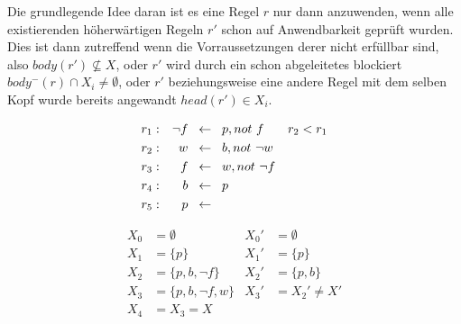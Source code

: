 Die grundlegende Idee daran ist es eine Regel $r$ nur dann anzuwenden, wenn alle
existierenden höherwärtigen Regeln $r'$ schon auf Anwendbarkeit geprüft wurden.
Dies ist dann zutreffend wenn die Vorraussetzungen derer nicht erfüllbar sind, also
$body(r') \not\subseteq X$, oder $r'$ wird durch ein schon abgeleitetes blockiert
$body^-(r) \cap X_i \neq \emptyset$, oder $r'$ beziehungsweise eine andere Regel mit
dem selben Kopf wurde bereits angewandt $head(r') \in X_i$. \\

\begin{minipage}{0.8\textwidth}
  \begin{example}
    \begin{align*}
      r_1: && \neg f \hspace*{0.2cm}&\leftarrow \hspace*{0.2cm}p, not~f &  r_2 < r_1\\
      r_2: && w \hspace*{0.2cm}&\leftarrow \hspace*{0.2cm}b, not~\neg w \\
      r_3: && f \hspace*{0.2cm}&\leftarrow \hspace*{0.2cm}w, not~\neg f \\
      r_4: && b \hspace*{0.2cm}&\leftarrow \hspace*{0.2cm}p \\
      r_5: && p \hspace*{0.2cm}&\leftarrow
    \end{align*}
  \end{example}
\end{minipage}

\begin{align*}
  X_0 &= \emptyset           & X_0' &= \emptyset \\
  X_1 &= \{p\}               & X_1' &= \{p\} \\
  X_2 &= \{p, b, \neg f\}    & X_2' &= \{p, b\} \\
  X_3 &= \{p, b, \neg f, w\} & X_3' &= X_2' \not = X' \\
  X_4 &= X_3 = X
\end{align*}








